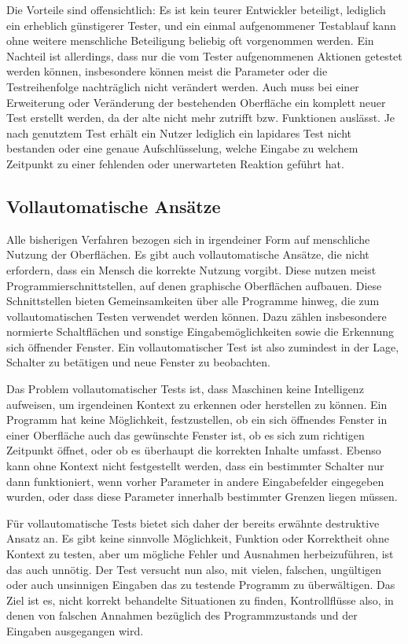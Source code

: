Die Vorteile sind offensichtlich: Es ist kein teurer Entwickler beteiligt, lediglich ein
erheblich günstigerer Tester, und ein einmal aufgenommener Testablauf kann ohne weitere
menschliche Beteiligung beliebig oft vorgenommen werden. Ein Nachteil ist allerdings, dass
nur die vom Tester aufgenommenen Aktionen getestet werden können, insbesondere können
meist die Parameter oder die Testreihenfolge nachträglich nicht verändert werden. Auch
muss bei einer Erweiterung oder Veränderung der bestehenden Oberfläche ein komplett neuer Test
erstellt werden, da der alte nicht mehr zutrifft bzw. Funktionen auslässt. Je nach genutztem
Test erhält ein Nutzer lediglich ein lapidares \glqq{}Test nicht bestanden\grqq{} oder
eine genaue Aufschlüsselung, welche Eingabe zu welchem Zeitpunkt zu einer fehlenden 
oder unerwarteten Reaktion geführt hat.

\subsection{Vollautomatische Ansätze}

Alle bisherigen Verfahren bezogen sich in irgendeiner Form auf menschliche Nutzung der
Oberflächen. Es gibt auch vollautomatische Ansätze, die nicht erfordern, dass ein Mensch
die korrekte Nutzung vorgibt. Diese nutzen meist Programmierschnittstellen,
auf denen graphische Oberflächen aufbauen. Diese Schnittstellen bieten Gemeinsamkeiten
über alle Programme hinweg, die zum vollautomatischen Testen verwendet werden können.
Dazu zählen insbesondere normierte Schaltflächen und sonstige Eingabemöglichkeiten
sowie die Erkennung sich öffnender Fenster. Ein vollautomatischer Test ist also zumindest
in der Lage, Schalter zu betätigen und neue Fenster zu beobachten.

Das Problem vollautomatischer Tests ist, dass Maschinen keine Intelligenz aufweisen,
um irgendeinen Kontext zu erkennen oder herstellen zu können. Ein Programm hat
keine Möglichkeit, festzustellen, ob ein sich öffnendes Fenster in einer Oberfläche
auch das gewünschte Fenster ist, ob es sich zum richtigen Zeitpunkt öffnet, oder
ob es überhaupt die korrekten Inhalte umfasst. Ebenso kann ohne Kontext nicht festgestellt
werden, dass ein bestimmter Schalter nur dann funktioniert, wenn vorher Parameter
in andere Eingabefelder eingegeben wurden, oder dass diese Parameter innerhalb bestimmter
Grenzen liegen müssen.

Für vollautomatische Tests bietet sich daher der bereits erwähnte destruktive Ansatz an.
Es gibt keine sinnvolle Möglichkeit, Funktion oder Korrektheit ohne Kontext zu testen,
aber um mögliche Fehler und Ausnahmen herbeizuführen, ist das auch unnötig.
Der Test versucht nun also, mit vielen, falschen, ungültigen oder auch unsinnigen
Eingaben das zu testende Programm zu überwältigen. Das Ziel ist es, nicht korrekt
behandelte Situationen zu finden, Kontrollflüsse also, in denen von falschen
Annahmen bezüglich des Programmzustands und der Eingaben ausgegangen wird.

